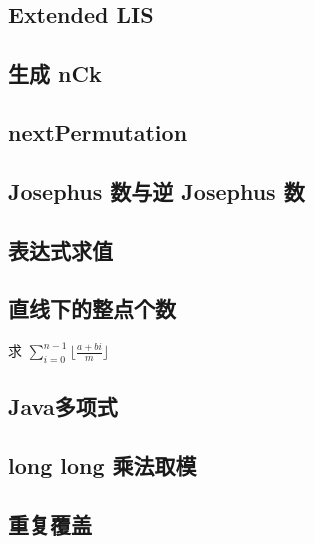 \documentclass[landscape, twocolumn, 8pt, a4paper, twoside]{extarticle}
\begin{document}
  \subsection{Extended LIS}
    

  \subsection{生成 nCk}
    

  \subsection{nextPermutation}
    

  \subsection{Josephus 数与逆 Josephus 数}
    
  
  \subsection{表达式求值}
    

%    

  \subsection{直线下的整点个数}
    求 $\sum_{i=0}^{n-1} \lfloor\frac{a+bi}{m}\rfloor$
    

  \subsection{Java多项式}
    

  \subsection{long long 乘法取模}
    

  \subsection{重复覆盖}
    
  
\end{document}

